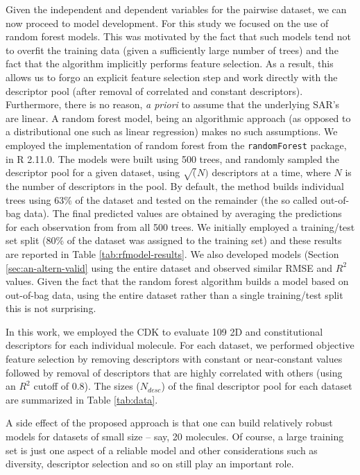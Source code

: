 \documentclass[letterpaper, 12pt]{article}
\begin{document}
Given the independent and dependent variables for the pairwise dataset, we can now proceed to model
development. For this study we focused on the use of random forest models\cite{Breiman:1984aa}. This
was motivated by the fact that such models tend not to overfit the training data (given a
sufficiently large number of trees) and the fact that the algorithm implicitly performs feature
selection. As a result, this allows us to forgo an explicit feature selection step and work directly
with the descriptor pool (after removal of correlated and constant descriptors). Furthermore, there
is no reason, \emph{a priori} to assume that the underlying SAR's are linear. A random forest model,
being an algorithmic approach\cite{Breiman:2001nx} (as opposed to a distributional one such as
linear regression) makes no such assumptions. We employed the implementation of random forest from
the \texttt{randomForest} package, in R 2.11.0\cite{r}. The models were built using 500 trees, and
randomly sampled the descriptor pool for a given dataset, using $\sqrt(N)$ descriptors at a time,
where $N$ is the number of descriptors in the pool. By default, the method builds individual trees
using 63\% of the dataset and tested on the remainder (the so called out-of-bag data). The final
predicted values are obtained by averaging the predictions for each observation from from all 500
trees. We initially employed a training/test set split (80\% of the dataset was assigned to the
training set) and these results are reported in Table \ref{tab:rfmodel-results}. We also developed
models (Section \ref{sec:an-altern-valid} using the entire dataset and observed similar RMSE and
$R^2$ values. Given the fact that the random forest algorithm builds a model based on out-of-bag
data, using the entire dataset rather than a single training/test split this is not surprising.

In this work, we employed the CDK to evaluate 109 2D and constitutional descriptors for each
individual molecule. For each dataset, we performed objective feature selection by removing
descriptors with constant or near-constant values followed by removal of descriptors that are highly
correlated with others (using an $R^2$ cutoff of 0.8). The sizes ($N_{desc}$) of the final
descriptor pool for each dataset are summarized in Table \ref{tab:data}.

A side effect of the proposed approach is that one can build relatively robust models for datasets of
small size -- say, 20 molecules. Of course, a large training set is just one aspect of a reliable
model and other considerations such as diversity, descriptor selection and so on still play an
important role.
\end{document}
